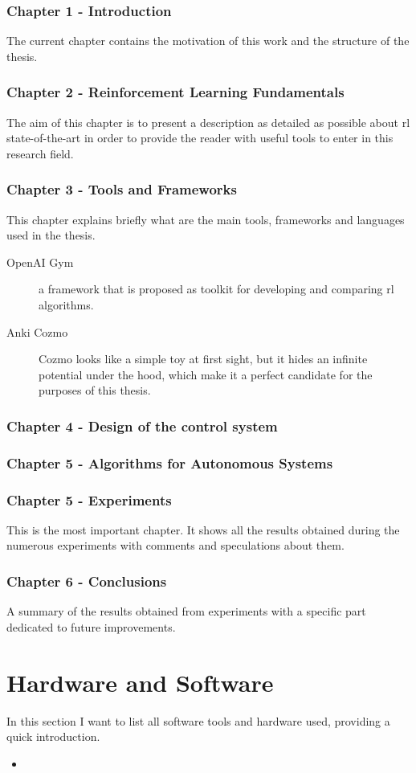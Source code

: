 \subsubsection*{Chapter 1 - Introduction} The current chapter contains the motivation of this work and the structure of the thesis.

\subsubsection*{Chapter 2 - Reinforcement Learning Fundamentals}
The aim of this chapter is to present a description as detailed as possible about \gls{rl} state-of-the-art in order to provide the reader with useful tools to enter in this research field.
\subsubsection*{Chapter 3 - Tools and Frameworks} 
This chapter explains briefly what are the main tools, frameworks and languages used in the thesis.
\begin{description}
	\item[OpenAI Gym] a framework that is proposed as toolkit for developing and comparing \gls{rl} algorithms.
	\item [Anki Cozmo] Cozmo looks like a simple toy at first sight, but it hides an infinite potential under the hood, which make it a perfect candidate for the purposes of this thesis.
\end{description}

\subsubsection*{Chapter 4 - Design of the control system}

\subsubsection*{Chapter 5 - Algorithms for Autonomous Systems} 


\subsubsection*{Chapter 5 - Experiments} 
This is the most important chapter. It shows all the results obtained during the numerous experiments with comments and speculations about them.

\subsubsection*{Chapter 6 - Conclusions} 
A summary of the results obtained from experiments with a specific part dedicated to future improvements.



\section{Hardware and Software}
In this section I want to list all software tools and hardware used, providing a quick introduction.

\begin{itemize}
	\item 
\end{itemize}